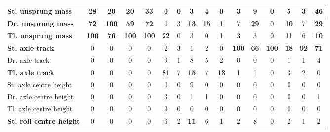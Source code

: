 \begin{table}[H]
\begin{tabular}{|l|c|c|c|c|c|c|c|c|c|c|c|c|c|c|c|}
    \hline
    \textcolor[rgb]{0.000, 0.620, 0.451}{\textbf{St. unsprung mass}} & \textcolor[rgb]{0.000, 0.620, 0.451}{\textbf{28}} & \textbf{20} & \textbf{20} & \textcolor[rgb]{0.000, 0.620, 0.451}{\textbf{33}} & 0 & 0 & 3 & 4 & 0 & 3 & 9 & 0 & 5 & 3 & \textcolor[rgb]{0.000, 0.620, 0.451}{\textbf{46}} \\
    \hline
    \textcolor[rgb]{0.851, 0.373, 0.008}{\textbf{Dr. unsprung mass}} & \textcolor[rgb]{0.000, 0.447, 0.698}{\textbf{72}} & \textcolor[rgb]{0.835, 0.369, 0.000}{\textbf{100}} & \textcolor[rgb]{0.000, 0.447, 0.698}{\textbf{59}} & \textcolor[rgb]{0.000, 0.447, 0.698}{\textbf{72}} & 0 & 3 & \textbf{13} & \textbf{15} & 1 & 7 & \textcolor[rgb]{0.000, 0.620, 0.451}{\textbf{29}} & 0 & \textbf{10} & 7 & \textcolor[rgb]{0.000, 0.620, 0.451}{\textbf{29}} \\
    \hline
    \textcolor[rgb]{0.851, 0.373, 0.008}{\textbf{Tl. unsprung mass}} & \textcolor[rgb]{0.835, 0.369, 0.000}{\textbf{100}} & \textcolor[rgb]{0.000, 0.447, 0.698}{\textbf{76}} & \textcolor[rgb]{0.835, 0.369, 0.000}{\textbf{100}} & \textcolor[rgb]{0.835, 0.369, 0.000}{\textbf{100}} & \textbf{22} & 0 & 3 & 0 & 1 & 3 & 3 & 0 & \textbf{11} & 6 & \textbf{10} \\
    \hline
    \textcolor[rgb]{0.851, 0.373, 0.008}{\textbf{St. axle track}} & 0 & 0 & 0 & 0 & 2 & 3 & 1 & 2 & 0 & \textcolor[rgb]{0.835, 0.369, 0.000}{\textbf{100}} & \textcolor[rgb]{0.000, 0.447, 0.698}{\textbf{66}} & \textcolor[rgb]{0.835, 0.369, 0.000}{\textbf{100}} & \textbf{18} & \textcolor[rgb]{0.000, 0.447, 0.698}{\textbf{92}} & \textcolor[rgb]{0.000, 0.447, 0.698}{\textbf{71}} \\
    \hline
    Dr. axle track & 0 & 0 & 0 & 0 & 9 & 1 & 8 & 5 & 2 & 0 & 0 & 0 & 1 & 1 & 4 \\
    \hline
    \textcolor[rgb]{0.000, 0.447, 0.698}{\textbf{Tl. axle track}} & 0 & 0 & 0 & 0 & \textcolor[rgb]{0.000, 0.447, 0.698}{\textbf{81}} & 7 & \textbf{15} & 7 & \textbf{13} & 1 & 1 & 0 & 3 & 2 & 0 \\
    \hline
    St. axle centre height & 0 & 0 & 0 & 0 & 0 & 0 & 9 & 0 & 0 & 0 & 0 & 0 & 0 & 0 & 0 \\
    \hline
    Dr. axle centre height & 0 & 0 & 0 & 0 & 3 & 0 & 1 & 1 & 0 & 0 & 0 & 0 & 0 & 0 & 1 \\
    \hline
    Tl. axle centre height & 0 & 0 & 0 & 0 & 9 & 0 & 0 & 0 & 0 & 0 & 0 & 0 & 0 & 0 & 0 \\
    \hline
    \textbf{St. roll centre height} & 0 & 0 & 0 & 0 & 6 & 2 & \textbf{11} & 6 & 1 & 2 & 8 & 0 & 2 & 1 & 2 \\

\end{tabular}
\end{table}
